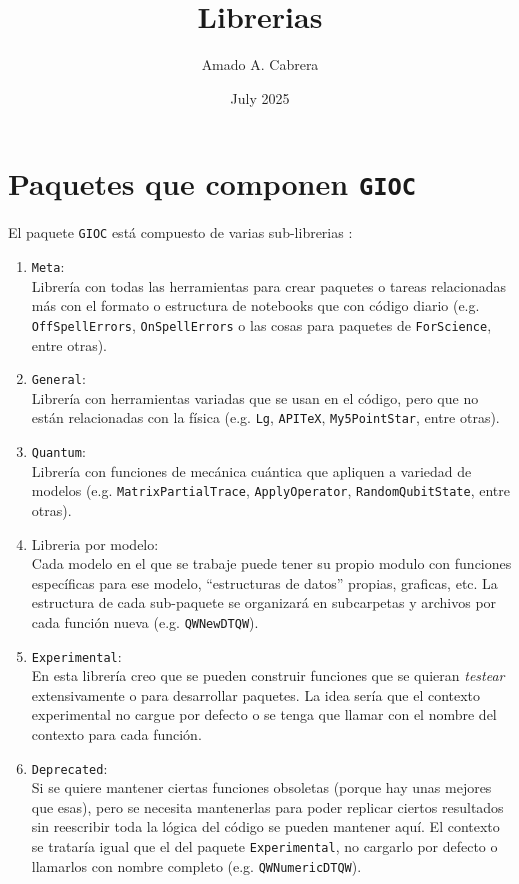 \documentclass{article}
\title{Librerias \GIOC}
\author{Amado A. Cabrera}
\date{July 2025}
\newcommand{\GIOC}{\texttt{GIOC}}
\begin{document}
\maketitle

\section{Paquetes que componen \GIOC}
El paquete \GIOC{}  está compuesto de varias sub-librerias :
\begin{enumerate}
    \item \texttt{Meta}:\\
    Librería con todas las herramientas para crear paquetes o  tareas relacionadas más con el formato o estructura de notebooks que con código diario (e.g. \texttt{OffSpellErrors}, \texttt{OnSpellErrors} o las cosas para paquetes de \texttt{ForScience}, entre otras).

    \item \texttt{General}:\\
    Librería con herramientas variadas que se usan en el código, pero que no están relacionadas con la física (e.g. \texttt{Lg}, \texttt{APITeX}, \texttt{My5PointStar}, entre otras).

    \item \texttt{Quantum}:\\
    Librería con funciones de mecánica cuántica que apliquen a variedad de modelos (e.g. \texttt{MatrixPartialTrace}, \texttt{ApplyOperator}, \texttt{RandomQubitState}, entre otras).

    \item Libreria por modelo:\\
    Cada modelo en el que se trabaje puede tener su propio modulo con funciones específicas para ese modelo, ``estructuras de datos'' propias, graficas, etc. La estructura de cada sub-paquete se organizará en subcarpetas y archivos por cada función nueva  (e.g. \texttt{QW\textasciigrave NewDTQW}).

    \item \texttt{Experimental}:\\
    En esta librería creo que se pueden construir funciones que se quieran \textit{testear} extensivamente o para desarrollar paquetes. La idea sería que el contexto experimental no cargue por defecto o se tenga que llamar con el nombre del contexto para cada función.

    \item \texttt{Deprecated}:\\
    Si se quiere mantener ciertas funciones obsoletas (porque hay unas mejores que esas), pero se necesita mantenerlas para poder replicar ciertos resultados sin reescribir toda la lógica del código se pueden mantener aquí. El contexto se trataría igual que el del paquete \texttt{Experimental}, no cargarlo por defecto o llamarlos con nombre completo (e.g. \texttt{QW\textasciigrave NumericDTQW}).
\end{enumerate}
\end{document}
